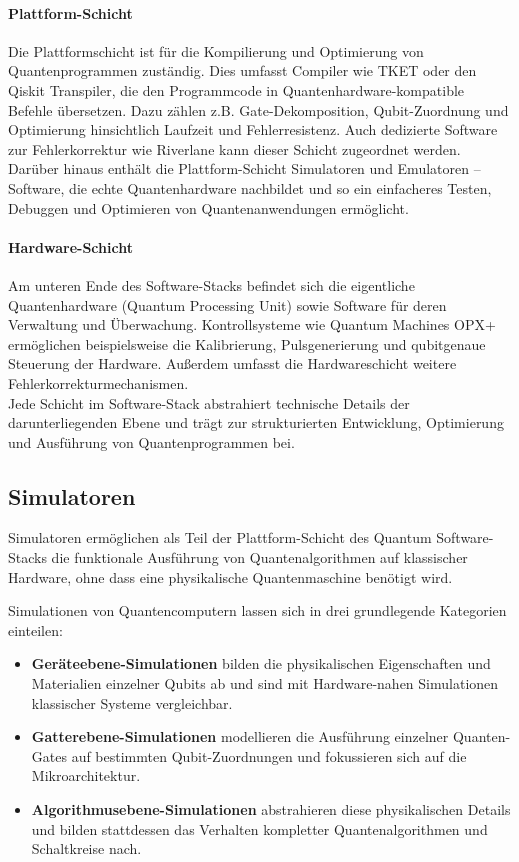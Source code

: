 \paragraph{Plattform-Schicht}  
Die Plattformschicht ist für die Kompilierung und Optimierung von Quantenprogrammen zuständig. Dies umfasst Compiler wie TKET oder den Qiskit Transpiler, die den Programmcode in Quantenhardware-kompatible Befehle übersetzen. Dazu zählen z.B. Gate-Dekomposition, Qubit-Zuordnung und Optimierung hinsichtlich Laufzeit und Fehlerresistenz. Auch dedizierte Software zur Fehlerkorrektur wie Riverlane kann dieser Schicht zugeordnet werden. Darüber hinaus enthält die Plattform-Schicht Simulatoren und Emulatoren -- Software, die echte Quantenhardware nachbildet und so ein einfacheres Testen, Debuggen und Optimieren von Quantenanwendungen ermöglicht.
\\

\paragraph{Hardware-Schicht}  
Am unteren Ende des Software-Stacks befindet sich die eigentliche Quantenhardware (Quantum Processing Unit) sowie Software für deren Verwaltung und Überwachung. Kontrollsysteme wie Quantum Machines OPX+ ermöglichen beispielsweise die Kalibrierung, Pulsgenerierung und qubitgenaue Steuerung der Hardware. Außerdem umfasst die Hardwareschicht weitere Fehlerkorrekturmechanismen.
\\

Jede Schicht im Software-Stack abstrahiert technische Details der darunterliegenden Ebene und trägt zur strukturierten Entwicklung, Optimierung und Ausführung von Quantenprogrammen bei. \autocite{shehata_building_2025} \autocite{ryan_understanding_2024}

\subsection{Simulatoren}
\label{sec:simulators}

Simulatoren ermöglichen als Teil der Plattform-Schicht des Quantum Software-Stacks die funktionale Ausführung von Quantenalgorithmen auf klassischer Hardware, ohne dass eine physikalische Quantenmaschine benötigt wird.

Simulationen von Quantencomputern lassen sich in drei grundlegende Kategorien einteilen:
\begin{itemize}
\item \textbf{Geräteebene-Simulationen} bilden die physikalischen Eigenschaften und Materialien einzelner Qubits ab und sind mit Hardware-nahen Simulationen klassischer Systeme vergleichbar.
\item \textbf{Gatterebene-Simulationen} modellieren die Ausführung einzelner Quanten-Gates auf bestimmten Qubit-Zuordnungen und fokussieren sich auf die Mikroarchitektur.
\item \textbf{Algorithmusebene-Simulationen} abstrahieren diese physikalischen Details und bilden stattdessen das Verhalten kompletter Quantenalgorithmen und Schaltkreise nach.
\end{itemize}

